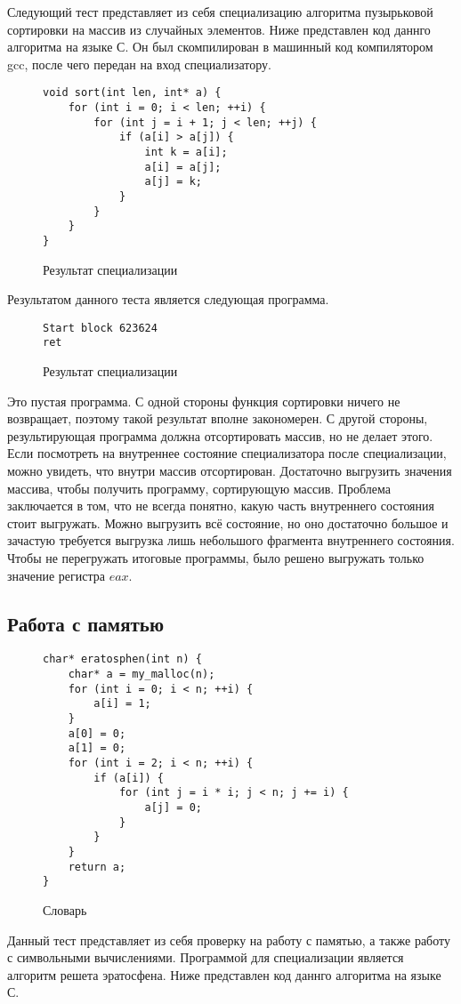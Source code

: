 \documentclass{spbau-diploma}
\begin{document}
Следующий тест представляет из себя специализацию алгоритма пузырьковой сортировки на массив из случайных элементов. Ниже представлен код даннго алгоритма на языке С. Он был скомпилирован в машинный код компилятором gcc, после чего передан на вход специализатору.
\begin{figure}
\begin{lstlisting}[xleftmargin = 20pt]
void sort(int len, int* a) {
    for (int i = 0; i < len; ++i) {
        for (int j = i + 1; j < len; ++j) {
            if (a[i] > a[j]) {
                int k = a[i];
                a[i] = a[j];
                a[j] = k;
            }
        }
    }
}
\end{lstlisting}
\caption{ Результат специализации}
\label{fig:speckmp}
\end{figure}
Результатом данного теста является следующая программа.
\begin{wrapfigure}{r}{0.4\textwidth}
\begin{lstlisting}[xleftmargin = 20pt]
Start block 623624
ret
\end{lstlisting}
\caption{ Результат специализации}
\label{fig:speckmp}
\end{wrapfigure}
Это пустая программа. С одной стороны функция сортировки ничего не возвращает, поэтому такой результат вполне закономерен. С другой стороны, результирующая программа должна отсортировать массив, но не делает этого. Если посмотреть на внутреннее состояние специализатора после специализации, можно увидеть, что внутри массив отсортирован. Достаточно выгрузить значения массива, чтобы получить программу, сортирующую массив. Проблема заключается в том, что не всегда понятно, какую часть внутреннего состояния стоит выгружать. Можно выгрузить всё состояние, но оно достаточно большое и зачастую требуется выгрузка лишь небольшого фрагмента внутреннего состояния. Чтобы не перегружать итоговые программы, было решено выгружать только значение регистра $eax$.

\subsection{ Работа с памятью}
\begin{figure}
\begin{lstlisting}[xleftmargin = 20pt]
char* eratosphen(int n) {
    char* a = my_malloc(n);
    for (int i = 0; i < n; ++i) {
        a[i] = 1;
    }
    a[0] = 0;
    a[1] = 0;
    for (int i = 2; i < n; ++i) {
        if (a[i]) {
            for (int j = i * i; j < n; j += i) {
                a[j] = 0;
            }
        }
    }
    return a;
}
\end{lstlisting}
\caption{ Словарь}
\label{fig:speckmp}
\end{figure}
Данный тест представляет из себя проверку на работу с памятью, а также работу с символьными вычислениями. Программой для специализации является алгоритм решета эратосфена. Ниже представлен код даннго алгоритма на языке С.
\end{document}
